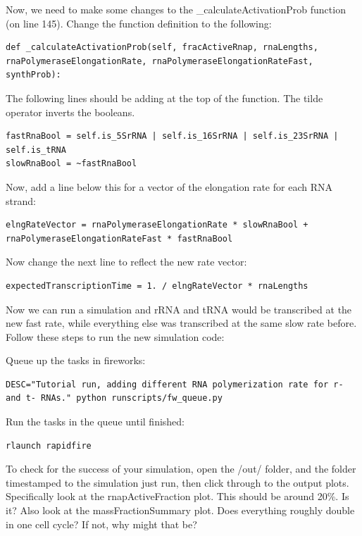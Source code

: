 \documentclass[12pt]{article}
\begin{document}
Now, we need to make some changes to the _calculateActivationProb function (on line 145). Change the function definition to the following:

\begin{lstlisting}
def _calculateActivationProb(self, fracActiveRnap, rnaLengths, rnaPolymeraseElongationRate, rnaPolymeraseElongationRateFast, synthProb):
\end{lstlisting}

The following lines should be adding at the top of the function. The tilde operator inverts the booleans.

\begin{lstlisting}
fastRnaBool = self.is_5SrRNA | self.is_16SrRNA | self.is_23SrRNA | self.is_tRNA
slowRnaBool = ~fastRnaBool
\end{lstlisting}

Now, add a line below this for a vector of the elongation rate for each RNA strand:

\begin{lstlisting}
elngRateVector = rnaPolymeraseElongationRate * slowRnaBool +  rnaPolymeraseElongationRateFast * fastRnaBool
\end{lstlisting}

Now change the next line to reflect the new rate vector:

\begin{lstlisting}
expectedTranscriptionTime = 1. / elngRateVector * rnaLengths
\end{lstlisting}

\par
Now we can run a simulation and rRNA and tRNA would be transcribed at the new fast rate, while everything else was transcribed at the same slow rate before. Follow these steps to run the new simulation code:
\par
Queue up the tasks in fireworks:

\lstset{language=bash}
\begin{lstlisting}
DESC="Tutorial run, adding different RNA polymerization rate for r- and t- RNAs." python runscripts/fw_queue.py
\end{lstlisting}

Run the tasks in the queue until finished:

\begin{lstlisting}
rlaunch rapidfire
\end{lstlisting}

To check for the success of your simulation, open the /out/ folder, and the folder timestamped to the simulation just run, then click through to the output plots. Specifically look at the rnapActiveFraction plot. This should be around 20\%. Is it? Also look at the massFractionSummary plot. Does everything roughly double in one cell cycle? If not, why might that be?
\end{document}
